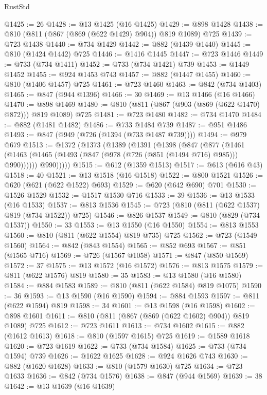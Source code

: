\begin{lexlean}{RustStd}
\begin{coremodule}
@1425 := 26
@1428 := @13 @1425 (@16 @1425)
@1429 := @898 @1428
@1438 := @810 (@811 (@867 (@869 (@622 @1429) @904)) @819 @1089) @725
@1439 := @723 @1438
@1440 := @734 @1429
@1442 := @882 (@1439 @1440)
@1445 := @810 (@1424 @1442) @725
@1446 := @1416 @1445
@1447 := @723 @1446
@1449 := @733 (@734 @1411)
@1452 := @733 (@734 @1421) @739
@1453 := @1449 @1452
@1455 := @924 @1453 @743
@1457 := @882 (@1447 @1455)
@1460 := @810 (@1406 @1457) @725
@1461 := @723 @1460
@1463 := @842 (@734 @1403)
@1465 := @847 (@944 @1396)
@1466 := 30
@1469 := @13 @1466 (@16 @1466)
@1470 := @898 @1469
@1480 := @810 (@811 (@867 (@903 (@869 (@622 @1470) @872))) @819 @1089) @725
@1481 := @723 @1480
@1482 := @734 @1470
@1484 := @882 (@1481 @1482)
@1486 := @733 @1484 @739
@1487 := @951 @1486
@1493 := @847 (@949 (@726 (@1394 (@733 @1487 @739))))
@1494 := @979 @679
@1513 := @1372
    (@1373
      (@1389
        (@1391
          (@1398
            (@847
              (@877
                (@1461 (@1463 (@1465 (@1493 (@847 (@978 (@726 (@851 (@1494 @716) @985))) @990))))))
              @990)))))
@1515 := @612 (@1359 @1513)
@1517 := @613 (@616 @43)
@1518 := 40
@1521 := @13 @1518 (@16 @1518)
@1522 := @800 @1521
@1526 := @620 (@621 (@622 @1522) @693)
@1529 := @620 (@642 @690) @701
@1530 := @1526 @1529
@1532 := @1517 @1530 @716
@1533 := 39
@1536 := @13 @1533 (@16 @1533)
@1537 := @813 @1536
@1545 := @723 (@810 (@811 (@622 @1537) @819 (@734 @1522)) @725)
@1546 := @826 @1537
@1549 := @810 (@829 (@734 @1537))
@1550 := 33
@1553 := @13 @1550 (@16 @1550)
@1554 := @813 @1553
@1560 := @810 (@811 (@622 @1554) @819 @735) @725
@1562 := @723 (@1549 @1560)
@1564 := @842 (@843 @1554)
@1565 := @852 @693
@1567 := @851 (@1565 @716)
@1569 := @726 (@1567 @1058)
@1571 := @847 (@850 @1569)
@1572 := 37
@1575 := @13 @1572 (@16 @1572)
@1576 := @813 @1575
@1579 := @811 (@622 @1576) @819
@1580 := 35
@1583 := @13 @1580 (@16 @1580)
@1584 := @884 @1583
@1589 := @810 (@811 (@622 @1584) @819 @1075)
@1590 := 36
@1593 := @13 @1590 (@16 @1590)
@1594 := @884 @1593
@1597 := @811 (@622 @1594) @819
@1598 := 34
@1601 := @13 @1598 (@16 @1598)
@1602 := @898 @1601
@1611 := @810 (@811 (@867 (@869 (@622 @1602) @904)) @819 @1089) @725
@1612 := @723 @1611
@1613 := @734 @1602
@1615 := @882 (@1612 @1613)
@1618 := @810 (@1597 @1615) @725
@1619 := @1589 @1618
@1620 := @723 @1619
@1622 := @733 (@734 @1584)
@1625 := @733 (@734 @1594) @739
@1626 := @1622 @1625
@1628 := @924 @1626 @743
@1630 := @882 (@1620 @1628)
@1633 := @810 (@1579 @1630) @725
@1634 := @723 @1633
@1636 := @842 (@734 @1576)
@1638 := @847 (@944 @1569)
@1639 := 38
@1642 := @13 @1639 (@16 @1639)

\end{coremodule}
\end{lexlean}
